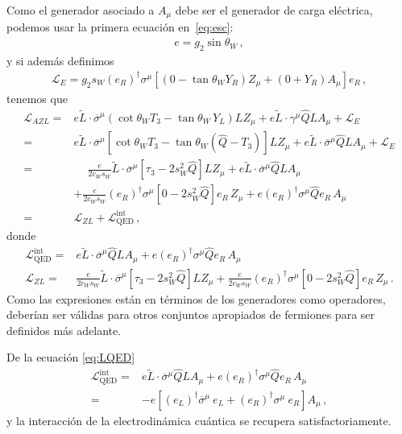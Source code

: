 Como el generador asociado a $A_\mu$ debe ser el generador de carga eléctrica, podemos usar la primera ecuación en~\eqref{eq:esc}:
\begin{align}
  e=g_2\sin\theta_W\,,
\end{align}
y si además definimos
\begin{align}
  \mathcal{L}_{E}=g_2 s_W \left(e_R \right)^{\dagger}\sigma^\mu \left[ \left(0 -\tan\theta_W  Y_R  \right) Z_{\mu}  +\left( 0+ Y_R \right)  A_{\mu} \right]{e_R}\,,
\end{align}
tenemos que
\begin{align}
\label{eq:lazlf}
    \mathcal{L}_{A Z L}
=&e \widetilde{L}\cdot\overline{\sigma}^\mu\left(\cot\theta_W T_3-\tan\theta_W\,Y_L\right)L Z_\mu
       +e \widetilde{L}\cdot\gamma^\mu \widehat{Q} L A_\mu+\mathcal{L}_E\nonumber\\
=&e \widetilde{L}\cdot\overline{\sigma}^\mu\left[\cot\theta_W T_3-\tan\theta_W\left(\widehat{Q}-T_3\right)\right]L Z_\mu
       +e \widetilde{L}\cdot\overline{\sigma}^\mu \widehat{Q} L A_\mu + \mathcal{L}_E\nonumber\\
=&\phantom{+}\frac{e}{2c_W s_W} \widetilde{L}\cdot\overline{\sigma}^\mu\left[ \tau_3-2s_W^2\widehat{Q}\right]L Z_\mu
       +e \widetilde{L}\cdot\overline{\sigma}^\mu \widehat{Q} L A_\mu \nonumber\\
&+\frac{e}{2c_W s_W} \left( e_R \right)^{\dagger}{\sigma}^\mu\left[ 0-2s_W^2\widehat{Q}\right]e_R\, Z_\mu
       +e \left( e_R \right)^{\dagger}{\sigma}^\mu \widehat{Q} e_R\, A_\mu \nonumber\\
=&\mathcal{L}_{ZL}+\mathcal{L}^{\text{int}}_{\text{QED}} \,,
\end{align}
donde
\begin{align}
  \label{eq:LQED}
     \mathcal{L}^{\text{int}}_{\text{QED}}=&e \widetilde{L}\cdot\overline{\sigma}^\mu \widehat{Q} L A_\mu+
e \left( e_R \right)^{\dagger}{\sigma}^\mu \widehat{Q} e_R\, A_\mu \\
\mathcal{L}_{ZL}=&\frac{e}{2c_W s_W} \widetilde{L}\cdot\overline{\sigma}^\mu\left[ \tau_3-2s_W^2\widehat{Q}\right]L Z_\mu
+\frac{e}{2c_W s_W} \left( e_R \right)^{\dagger}{\sigma}^\mu\left[ 0-2s_W^2\widehat{Q}\right]e_R\, Z_\mu\,.
\end{align}
Como las expresiones están en términos de los generadores como operadores, deberían ser válidas para otros conjuntos apropiados de fermiones para ser definidos más adelante.


De  la ecuación \eqref{eq:LQED}
\begin{align}
     \mathcal{L}^{\text{int}}_{\text{QED}}=&e \widetilde{L}\cdot\overline{\sigma}^\mu \widehat{Q} L A_\mu+
e \left( e_R \right)^{\dagger}{\sigma}^\mu \widehat{Q} e_R\, A_\mu \nonumber\\
=&-e \left[ \left( e_L \right)^{\dagger}\overline{\sigma}^\mu \ e_L + \left( e_R \right)^{\dagger}{\sigma}^\mu \ e_R  \right]A_{\mu}\,,
\end{align}
y la interacción de la electrodinámica cuántica se recupera satisfactoriamente.


